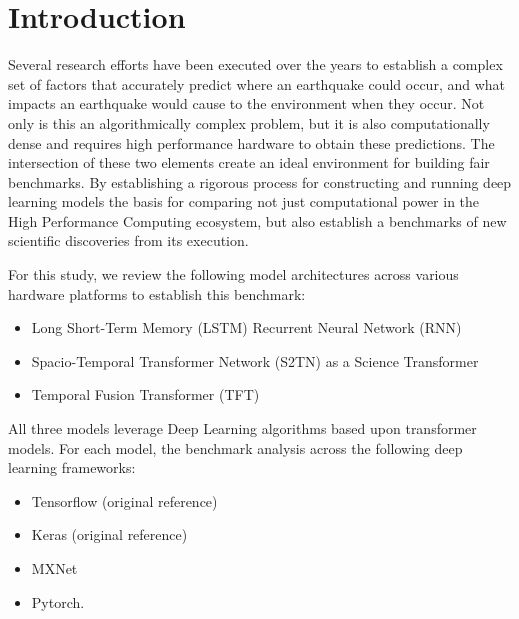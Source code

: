 \documentclass[sigplan,screen]{format/acmart}
\begin{document}


\maketitle

\section{Introduction}

Several research efforts have been executed over the years to establish a complex set of factors that accurately predict where an earthquake could occur, and what impacts an earthquake would cause to the environment when they occur.
Not only is this an algorithmically complex problem, but it is also computationally dense and requires high performance hardware to obtain these predictions\cite{fox2022aiforscience}.
The intersection of these two elements create an ideal environment for building fair benchmarks.
By establishing a rigorous process for constructing and running deep learning models the basis for comparing not just computational power in the High Performance Computing ecosystem, but also establish a benchmarks of new scientific discoveries from its execution.

For this study, we review the following model architectures across various hardware platforms to establish this benchmark:
\begin{itemize}
    \item Long Short-Term Memory (LSTM) Recurrent Neural Network (RNN)
    \item Spacio-Temporal Transformer Network (S2TN) as a Science Transformer
    \item Temporal Fusion Transformer (TFT)
\end{itemize}

All three models leverage Deep Learning algorithms based upon transformer models.
For each model, the benchmark analysis across the following deep learning frameworks:

\begin{itemize}
    \item Tensorflow (original reference)
    \item Keras (original reference)
    \item MXNet
    \item Pytorch.
\end{itemize}
\end{document}
